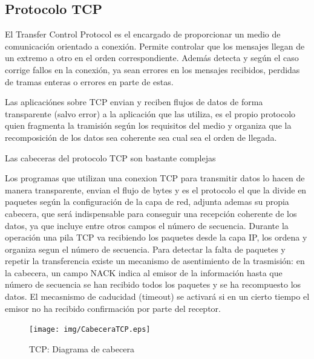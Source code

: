 \documentclass[a4paper,spanish,12pt]{book}
\begin{document}
\subsection{Protocolo TCP}
El Transfer Control Protocol es el encargado de proporcionar un medio de comunicación orientado a conexión. Permite controlar que los mensajes llegan de un extremo a otro en el orden correspondiente. Además detecta y según el caso corrige fallos en la conexión, ya sean errores en los mensajes recibidos, perdidas de tramas enteras o errores en parte de estas.

Las aplicaciónes sobre TCP envian y reciben flujos de datos de forma transparente (salvo error) a la aplicación que las utiliza, es el propio protocolo quien fragmenta la tramisión según los requisitos del medio y organiza que la recomposición de los datos sea coherente sea cual sea el orden de llegada.

Las cabeceras del protocolo TCP son bastante complejas

Los programas que utilizan una conexion TCP para transmitir datos lo hacen de manera transparente, envian el flujo de bytes y es el protocolo el que la divide en paquetes según la configuración de la capa de red, adjunta ademas su propia cabecera, que será indispensable para conseguir una recepción coherente de los datos, ya que incluye entre otros campos el número de secuencia. Durante la operación una pila TCP va recibiendo los paquetes desde la capa IP, los ordena y organiza segun el número de secuencia. Para detectar la falta de paquetes y repetir la transferencia existe un mecanismo de asentimiento de la trasmisión: en la cabecera, un campo NACK indica al emisor de la información hasta que número de secuencia se han recibido todos los paquetes y se ha recompuesto los datos. El mecasnismo de caducidad (timeout) se activará si en un cierto tiempo el emisor no ha recibido confirmación por parte del receptor.
\begin{figure}[h]
	\begin{center}
	\texttt{[image: img/CabeceraTCP.eps]}	
\end{center}
\caption{TCP: Diagrama de cabecera}
  \label{fig:CabeceraTCP}
\end{figure}
\end{document}

